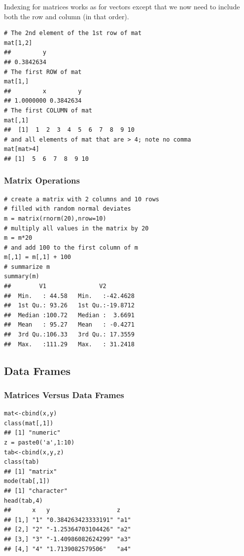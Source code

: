 \documentclass[]{article}
\theoremstyle{definition}
\theoremstyle{definition}
\theoremstyle{remark}
\begin{document}
Indexing for matrices works as for vectors except that we now need to
include both the row and column (in that order).

\begin{verbatim}
# The 2nd element of the 1st row of mat
mat[1,2]
##         y 
## 0.3842634
# The first ROW of mat
mat[1,]
##         x         y 
## 1.0000000 0.3842634
# The first COLUMN of mat
mat[,1]
##  [1]  1  2  3  4  5  6  7  8  9 10
# and all elements of mat that are > 4; note no comma
mat[mat>4]
## [1]  5  6  7  8  9 10
\end{verbatim}

\subsubsection{Matrix Operations}\label{matrix-operations-3}

\begin{verbatim}
# create a matrix with 2 columns and 10 rows
# filled with random normal deviates
m = matrix(rnorm(20),nrow=10)
# multiply all values in the matrix by 20
m = m*20
# and add 100 to the first column of m
m[,1] = m[,1] + 100
# summarize m
summary(m)
##        V1               V2          
##  Min.   : 44.58   Min.   :-42.4628  
##  1st Qu.: 93.26   1st Qu.:-19.8712  
##  Median :100.72   Median :  3.6691  
##  Mean   : 95.27   Mean   : -0.4271  
##  3rd Qu.:106.33   3rd Qu.: 17.3559  
##  Max.   :111.29   Max.   : 31.2418
\end{verbatim}

\subsection{Data Frames}\label{data-frames}

\subsubsection{Matrices Versus Data
Frames}\label{matrices-versus-data-frames}

\begin{verbatim}
mat<-cbind(x,y)
class(mat[,1])          
## [1] "numeric"
z = paste0('a',1:10)
tab<-cbind(x,y,z)
class(tab)
## [1] "matrix"
mode(tab[,1])
## [1] "character"
head(tab,4)
##      x   y                   z   
## [1,] "1" "0.384263423333191" "a1"
## [2,] "2" "-1.25364703104426" "a2"
## [3,] "3" "-1.40986082624299" "a3"
## [4,] "4" "1.7139082579506"   "a4"
\end{verbatim}
\end{document}
